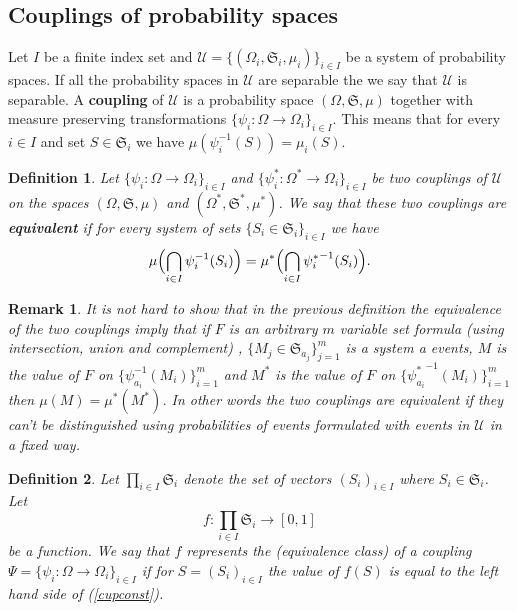 \documentclass [11pt] {article}
\newtheorem{remark}{Remark}[section]
\newtheorem{definition}{Definition}[section]
\begin{document}
\subsection{Couplings of probability spaces}


Let $I$ be a finite index set and $\mathcal{U}=\{(\Omega_i,\mathfrak{S}_i,\mu_i)\}_{i\in I}$ be a system of probability spaces. If all the probability spaces in $\mathcal{U}$ are separable the we say that $\mathcal{U}$ is separable.
A {\bf coupling } of $\mathcal{U}$ is a probability space $(\Omega,\mathfrak{S},\mu)$ together with measure preserving transformations $\{\psi_i:\Omega\rightarrow\Omega_i\}_{i\in I}.$ This means that for every $i\in I$ and set $S\in\mathfrak{S}_i$ we have $\mu(\psi_i^{-1}(S))=\mu_i(S)$. 


\begin{definition}\label{coupeq} Let $\{\psi_i:\Omega\rightarrow\Omega_i\}_{i\in I}$ and $\{\psi_i^*:\Omega^*\rightarrow\Omega_i\}_{i\in I}$ be two couplings of $\mathcal{U}$ on the spaces $(\Omega,\mathfrak{S},\mu)$ and $(\Omega^*,\mathfrak{S}^*,\mu^*)$.
We say that these two couplings are {\bf equivalent} if for every system of sets $\{S_i\in\mathfrak{S}_i\}_{i\in I}$ we have
\begin{equation}\label{cupconst}
\mu\Bigl(\bigcap_{i\in I}\psi_i^{-1}(S_i)\Bigr)=\mu^*\Bigl(\bigcap_{i\in I}{\psi_i^*}^{-1}(S_i)\Bigr).
\end{equation}
\end{definition}

\begin{remark} It is not hard to show that in the previous definition the equivalence of the two couplings imply that if $F$ is an arbitrary $m$ variable set formula (using intersection, union and complement) , $\{M_j\in\mathfrak{S}_{a_j}\}_{j=1}^m$ is a system a events, $M$ is the value of $F$ on $\{\psi_{a_i}^{-1}(M_i)\}_{i=1}^m$ and $M^*$ is the value of $F$ on $\{{\psi^*_{a_i}}^{-1}(M_i)\}_{i=1}^m$ then $\mu(M)=\mu^*(M^*)$.
In other words the two couplings are equivalent if they can't be distinguished using probabilities of events formulated with events in $\mathcal{U}$ in a fixed way.
\end{remark}

\begin{definition} Let $\prod_{i\in I}\mathfrak{S}_i$ denote the set of vectors $(S_i)_{i\in I}$ where $S_i\in\mathfrak{S}_i$. Let
\begin{equation}\label{couprep}
f:\prod_{i\in I}\mathfrak{S}_i\rightarrow [0,1]
\end{equation}
be a function. We say that $f$ represents the (equivalence class) of a coupling $\Psi=\{\psi_i:\Omega\rightarrow\Omega_i\}_{i\in I}$ if for $S=(S_i)_{i\in I}$ the value of $f(S)$ is equal to the left hand side of (\ref{cupconst}). 
\end{definition}
\end{document}
